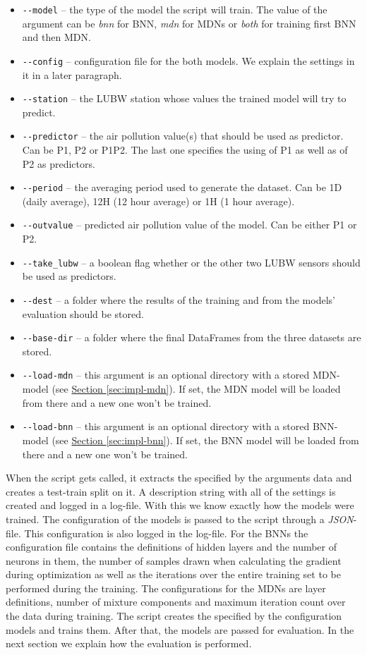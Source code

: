 \documentclass[12pt,a4paper,twoside]{scrartcl}
\numberwithin{equation}{section}
\newcommand{\refsec}[1]{\hyperref[#1]{Section \ref*{#1}}}
\begin{document}
\begin{itemize}
\item \texttt{-{}-model} -- the type of the model the script will train. The value of the argument can be \emph{bnn} for BNN, \emph{mdn} for MDNs or \emph{both} for training first BNN and then MDN.\@
\item \texttt{-{}-config} -- configuration file for the both models. We explain the settings in it in a later paragraph.\@
\item \texttt{-{}-station} -- the LUBW station whose values the trained model will try to predict.\@
\item \texttt{-{}-predictor} -- the air pollution value(s) that should be used as predictor. Can be P1, P2 or P1P2. The last one specifies the using of P1 as well as of P2 as predictors.\@
\item \texttt{-{}-period} -- the averaging period used to generate the dataset. Can be 1D (daily average), 12H (12 hour average) or 1H (1 hour average).\@
\item \texttt{-{}-outvalue} -- predicted air pollution value of the model. Can be either P1 or P2.\@
\item \texttt{-{}-take\_lubw} -- a boolean flag whether or the other two LUBW sensors should be used as predictors.\@
\item \texttt{-{}-dest} -- a folder where the results of the training and from the models' evaluation should be stored.\@
\item \texttt{-{}-base-dir} -- a folder where the final DataFrames from the three datasets are stored.\@
\item \texttt{-{}-load-mdn} -- this argument is an optional directory with a stored MDN-model (see \refsec{sec:impl-mdn}). If set, the MDN model will be loaded from there and a new one won't be trained.\@
\item \texttt{-{}-load-bnn} -- this argument is an optional directory with a stored BNN-model (see \refsec{sec:impl-bnn}). If set, the BNN model will be loaded from there and a new one won't be trained.\@
\end{itemize}
When the script gets called, it extracts the specified by the arguments data and creates a test-train split on it. A description string with all of the settings is created and logged in a log-file. With this we know exactly how the models were trained. The configuration of the models is passed to the script through a \emph{JSON}-file. This configuration is also logged in the log-file. For the BNNs the configuration file contains the definitions of hidden layers and the number of neurons in them, the number of samples drawn when calculating the gradient during optimization as well as the iterations over the entire training set to be performed during the training. The configurations for the MDNs are layer definitions, number of mixture components and maximum iteration count over the data during training. The script creates the specified by the configuration models and trains them. After that, the models are passed for evaluation. In the next section we explain how the evaluation is performed.
\end{document}
